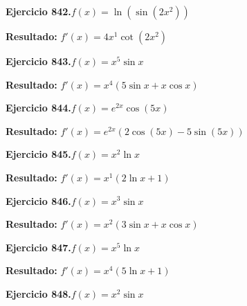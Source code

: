 \documentclass[10pt,a4paper]{article}
\begin{document}
\begin{ejbox}
\textbf{Ejercicio 842.}\quad $f(x) = \ln(\sin(2x^{2}))$
\end{ejbox}

\begin{solbox}
\textbf{Resultado:} \(\displaystyle f'(x) = 4x^{1}\cot(2x^{2})\)
\end{solbox}

\begin{ejbox}
\textbf{Ejercicio 843.}\quad $f(x) = x^{5} \sin x$
\end{ejbox}

\begin{solbox}
\textbf{Resultado:} \(\displaystyle f'(x) = x^{4}(5\sin x + x\cos x)\)
\end{solbox}

\newpage
\begin{ejbox}
\textbf{Ejercicio 844.}\quad $f(x) = e^{2x} \cos(5x)$
\end{ejbox}

\begin{solbox}
\textbf{Resultado:} \(\displaystyle f'(x) = e^{2x}(2\cos(5x) - 5\sin(5x))\)
\end{solbox}

\begin{ejbox}
\textbf{Ejercicio 845.}\quad $f(x) = x^{2} \ln x$
\end{ejbox}

\begin{solbox}
\textbf{Resultado:} \(\displaystyle f'(x) = x^{1}(2\ln x + 1)\)
\end{solbox}

\begin{ejbox}
\textbf{Ejercicio 846.}\quad $f(x) = x^{3} \sin x$
\end{ejbox}

\begin{solbox}
\textbf{Resultado:} \(\displaystyle f'(x) = x^{2}(3\sin x + x\cos x)\)
\end{solbox}

\newpage
\begin{ejbox}
\textbf{Ejercicio 847.}\quad $f(x) = x^{5} \ln x$
\end{ejbox}

\begin{solbox}
\textbf{Resultado:} \(\displaystyle f'(x) = x^{4}(5\ln x + 1)\)
\end{solbox}

\begin{ejbox}
\textbf{Ejercicio 848.}\quad $f(x) = x^{2} \sin x$
\end{ejbox}
\end{document}
